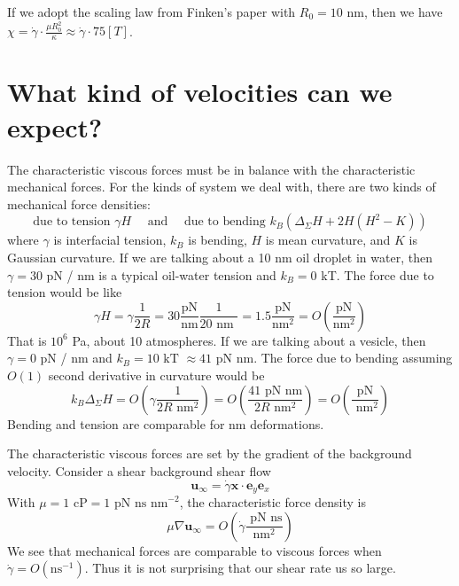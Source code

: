 \documentclass[12pt,letterpaper, onecolumn]{article}
\begin{document}
If we adopt the scaling law from Finken's paper with $R_0=10$ nm, then we have 
$\chi = \dot\gamma \cdot\frac{\mu R_0^2}{\kappa} \approx \dot\gamma \cdot 75[T]$. 


\section{What kind of velocities can we expect?}
The characteristic viscous forces must be in balance with the characteristic mechanical forces. 
For the kinds of system we deal with, there are two kinds of mechanical force densities:  
\begin{equation}
\text{due to tension } \gamma H \quad  \text{ and } \quad  \text{due to bending } k_B(\Delta_{\Sigma} H + 2H(H^2-K))
\end{equation}
where $\gamma$ is interfacial tension, $k_B$ is bending, $H$ is mean curvature, and $K$ is Gaussian curvature. 
If we are talking about a 10 nm oil droplet in water, then $\gamma = 30$ pN / nm is a typical oil-water tension and $k_B = 0$ kT.  The force due to tension would be like 
\begin{equation}
\gamma H = \gamma \frac{1}{2R} = 30 \frac{ \text{pN} }{\text{nm}} \frac{1}{20 \text{ nm }} = 1.5 \frac{ \text{pN} }{\text{nm}^2}
= O \left(\frac{ \text{pN} }{\text{nm}^2}\right)
\end{equation}
That is $10^6$ Pa, about 10 atmospheres.  If we are talking about a vesicle, then $\gamma = 0$ pN / nm and 
$k_B = 10 \text{ kT } \approx 41 \text{ pN nm}$.  The force due to bending assuming 
$O(1)$ second derivative in curvature would be 
\begin{equation}
k_B \Delta_{\Sigma} H 
=  O\left( \gamma \frac{1}{2R \text{ nm}^2}             \right) 
=  O\left( \frac{ 41 \text{ pN nm}}{2R \text{ nm}^2} \right)
=  O\left( \frac{\text{ pN }}{ \text{ nm}^2} \right)
\end{equation}
Bending and tension are comparable for nm deformations. 
  
The characteristic viscous forces are set by the gradient of the background velocity. 
Consider a shear background shear flow
\begin{equation}
\mathbf{u}_{\infty} = \dot \gamma \mathbf{x} \cdot \mathbf{e}_y \mathbf{e}_x
\end{equation}
With $\mu = 1 \text{ cP} = 1 \text{ pN ns nm}^{-2}$, the characteristic force density is 
\begin{equation}
\mu \nabla \mathbf{u}_{\infty} 
= O\left(\dot \gamma \frac{\text{ pN ns}}{\text{nm}^{2}} \right)
\end{equation}
We see that mechanical forces are comparable to viscous forces when $\dot \gamma = O( \text{ns}^{-1})$.
Thus it is not surprising that our shear rate us so large.
\end{document}
